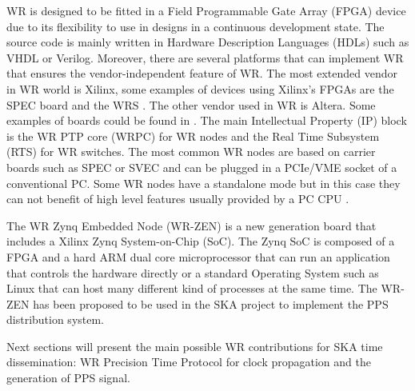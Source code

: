 
WR is designed to be fitted in a Field Programmable Gate Array (FPGA) device due to its flexibility to use in designs in a continuous development state. The source code is mainly written in Hardware Description Languages (HDLs) such as VHDL or Verilog. Moreover, there are several platforms that can implement WR that ensures the vendor-independent feature of WR. The most extended vendor in WR world is Xilinx, some examples of devices using Xilinx's FPGAs are the SPEC board \cite{ohwr:spec} and the WRS \cite{ohwr:wrs}. The other vendor used in WR is Altera. Some examples of boards could be found in \cite{cesar-altera-wr}. The main Intellectual Property (IP) block is the WR PTP core (WRPC) for WR nodes and the Real Time Subsystem (RTS) for WR switches. The most common WR nodes are based on carrier boards such as SPEC or SVEC and can be plugged in a PCIe/VME socket of a conventional PC. Some WR nodes have a standalone mode but in this case they can not benefit of high level features usually provided by a PC CPU				.

The WR Zynq Embedded Node (WR-ZEN) is a new generation board that includes a Xilinx Zynq System-on-Chip (SoC). The Zynq SoC is composed of a FPGA and a hard ARM dual core microprocessor that can run an application that controls the hardware directly or a standard Operating System such as Linux that can host many different kind of processes at the same time. The WR-ZEN has been proposed to be used in the SKA project to implement the PPS distribution system.

Next sections will present the main possible WR contributions for SKA time dissemination: WR Precision Time Protocol for clock propagation and the generation of PPS signal. 
